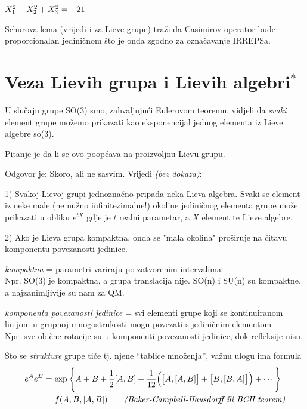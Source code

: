\begin{primjer}
$X_{1}^2 + X_{2}^2 + X_{3}^2 = -2 1 $

Schurova lema (vrijedi i za Lieve grupe) traži da Casimirov operator 
bude proporcionalan jediničnom što je onda zgodno za označavanje IRREPSa.
\end{primjer}

\section{Veza Lievih grupa i Lievih algebri$^*$}

U slučaju grupe SO(3) smo, zahvaljujući Eulerovom teoremu, vidjeli da
\emph{svaki} element grupe možemo prikazati kao eksponencijal jednog
elementa iz Lieve algebre so(3).

Pitanje je da li se ovo poopćava na proizvoljnu Lievu grupu.

Odgovor je: Skoro, ali ne sasvim. Vrijedi \emph{(bez dokaza)}:

1) Svakoj Lievoj grupi jednoznačno pripada neka Lieva algebra. Svaki 
  se element iz neke male (ne nužno infinitezimalne!) okoline 
  jediničnog elementa grupe može
  prikazati u obliku $e^{t X}$ gdje je $t$ realni parametar, a $X$ element
  te Lieve algebre.

2) Ako je Lieva grupa kompaktna, onda se "mala okolina" proširuje na
   čitavu komponentu povezanosti jedinice.

\emph{kompaktna} = parametri variraju po zatvorenim intervalima\\
   Npr. SO(3) je kompaktna, a grupa translacija nije. SO(n) i SU(n) su
 kompaktne, a najzanimljivije su nam za QM.

\emph{komponenta povezanosti jedinice} = svi elementi grupe koji se
kontinuiranom linijom u grupnoj mnogostrukosti mogu povezati s
jediničnim elementom\\
 Npr. sve obične rotacije su u komponenti povezanosti
jedinice, dok refleksije nisu.


Što se \emph{strukture} grupe tiče tj. njene ``tablice množenja'', važnu
ulogu ima formula
\begin{equation}
\begin{split}
  e^A e^B &= \exp\Bigg\{A+B+\frac{1}{2}[A,B]+\frac{1}{12}\Big(\big[A,[A,B]\big]+
 \big[B,[B,A]\big]\Big)+\cdots \Bigg\} \\
          &= f(A,B,[A,B]) \qquad \text{\emph{(Baker-Campbell-Hausdorff ili BCH teorem)}}
\end{split}
\end{equation}

